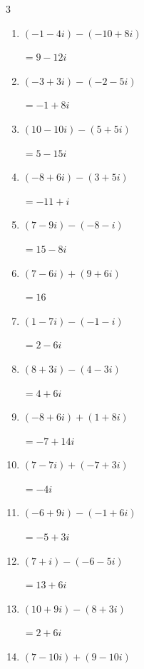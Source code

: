 \begin{multicols}{3}
\begin{enumerate}
        $\displaystyle =2+3i$

  \item $\displaystyle (-1-4i) - (-10+8i)$

        $\displaystyle =9-12i$

  \item $\displaystyle (-3+3i) - (-2-5i)$

        $\displaystyle =-1+8i$

  \item $\displaystyle (10-10i) - (5+5i)$

        $\displaystyle =5-15i$

  \item $\displaystyle (-8+6i) - (3+5i)$

        $\displaystyle =-11+i$

  \item $\displaystyle (7-9i) - (-8-i)$

        $\displaystyle =15-8i$

  \item $\displaystyle (7-6i) + (9+6i)$

        $\displaystyle =16$

  \item $\displaystyle (1-7i) - (-1-i)$

        $\displaystyle =2-6i$

  \item $\displaystyle (8+3i) - (4-3i)$

        $\displaystyle =4+6i$

  \item $\displaystyle (-8+6i) + (1+8i)$

        $\displaystyle =-7+14i$

  \item $\displaystyle (7-7i) + (-7+3i)$

        $\displaystyle =-4i$

  \item $\displaystyle (-6+9i) - (-1+6i)$

        $\displaystyle =-5+3i$

  \item $\displaystyle (7+i) - (-6-5i)$

        $\displaystyle =13+6i$

  \item $\displaystyle (10+9i) - (8+3i)$

        $\displaystyle =2+6i$

  \item $\displaystyle (7-10i) + (9-10i)$


\end{enumerate}
\end{multicols}
